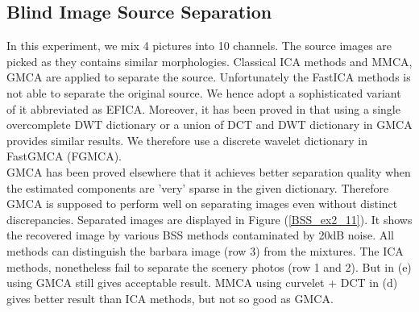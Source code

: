 \newpage
\subsection{Blind Image Source Separation}
In this experiment, we mix 4 pictures into 10 channels. The source images are picked as they contains similar morphologies. Classical ICA methods and MMCA, GMCA are applied to separate the source. Unfortunately the FastICA methods is not able to separate the original source. We hence adopt a sophisticated variant of it abbreviated as EFICA. Moreover, it has been proved in \cite{BobinJ_2007SaMD} that using a single overcomplete DWT dictionary or a union of DCT and DWT dictionary in GMCA provides similar results. We therefore use a discrete wavelet dictionary in FastGMCA (FGMCA).\\


GMCA has been proved elsewhere \cite{BobinJ_2007SaMD} that it achieves better separation quality when the estimated components are 'very' sparse in the given dictionary. Therefore GMCA is supposed to perform well on separating images even without distinct discrepancies. Separated images are displayed in Figure (\ref{BSS_ex2_11}). It shows the recovered image by various BSS methods contaminated by 20dB noise. All methods can distinguish the barbara image (row 3) from the mixtures. The ICA methods, nonetheless fail to separate the scenery photos (row 1 and 2). But in (e) using GMCA still gives acceptable result. MMCA using curvelet + DCT in (d) gives better result than ICA methods, but not so good as GMCA.\\


